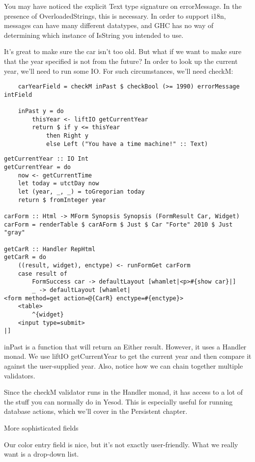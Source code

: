 You may have noticed the explicit Text type signature on errorMessage. In the presence of
OverloadedStrings, this is necessary. In order to support i18n, messages can have many
different datatypes, and GHC has no way of determining which instance of IsString you
intended to use.

It's great to make sure the car isn't too old. But what if we want to make sure that the
year specified is not from the future? In order to look up the current year, we'll need to
run some IO. For such circumstances, we'll need checkM:

\begin{lstlisting}
    carYearField = checkM inPast $ checkBool (>= 1990) errorMessage intField

    inPast y = do
        thisYear <- liftIO getCurrentYear
        return $ if y <= thisYear
            then Right y
            else Left ("You have a time machine!" :: Text)
\end{lstlisting}

\begin{lstlisting}
getCurrentYear :: IO Int
getCurrentYear = do
    now <- getCurrentTime
    let today = utctDay now
    let (year, _, _) = toGregorian today
    return $ fromInteger year

carForm :: Html -> MForm Synopsis Synopsis (FormResult Car, Widget)
carForm = renderTable $ carAForm $ Just $ Car "Forte" 2010 $ Just "gray"

getCarR :: Handler RepHtml
getCarR = do
    ((result, widget), enctype) <- runFormGet carForm
    case result of
        FormSuccess car -> defaultLayout [whamlet|<p>#{show car}|]
        _ -> defaultLayout [whamlet|
<form method=get action=@{CarR} enctype=#{enctype}>
    <table>
        ^{widget}
    <input type=submit>
|]
\end{lstlisting}

inPast is a function that will return an Either result. However, it uses a Handler monad.
We use liftIO getCurrentYear to get the current year and then compare it against the
user-supplied year. Also, notice how we can chain together multiple validators.

Since the checkM validator runs in the Handler monad, it has access to a lot of the stuff
you can normally do in Yesod. This is especially useful for running database actions,
which we'll cover in the Persistent chapter.

More sophisticated fields

Our color entry field is nice, but it's not exactly user-friendly. What we really want is
a drop-down list.

